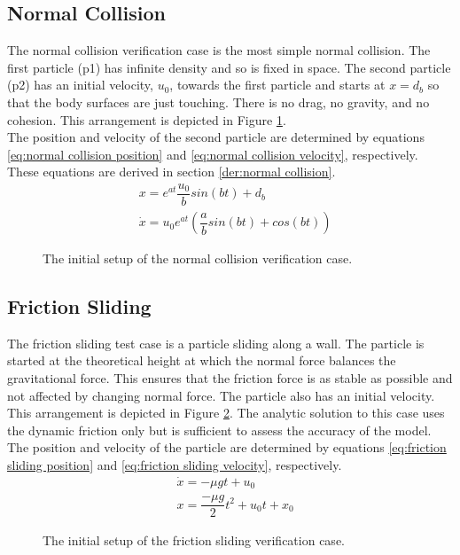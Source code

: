 \documentclass[10pt,a4paper,titlepage]{report}
\begin{document}
\subsection{Normal Collision}
\label{sec:normal collision verification}
The normal collision verification case is the most simple normal collision. The first particle (p1) has infinite density and so is fixed in space. The second particle (p2) has an initial velocity, $u_0$, towards the first particle and starts at $x = d_b$ so that the body surfaces are just touching. There is no drag, no gravity, and no cohesion. This arrangement is depicted in Figure \ref{fig:normal collision}.
\\The position and velocity of the second particle are determined by equations \ref{eq:normal collision position} and \ref{eq:normal collision velocity}, respectively. These equations are derived in section \ref{der:normal collision}.
\begin{align}
&x = e^{at} \dfrac{u_0}{b} sin(bt) + d_b \label{eq:normal collision position} \\
&\dot{x} = u_0 e^{at} (\dfrac{a}{b} sin(bt) + cos(bt)) \label{eq:normal collision velocity}
\end{align}
\begin{figure}[!ht]
\centering

\caption{The initial setup of the normal collision verification case.}
\label{fig:normal collision}
\end{figure}
\subsection{Friction Sliding}
\label{sec:friction sliding verification}
The friction sliding test case is a particle sliding along a wall. The particle is started at the theoretical height at which the normal force balances the gravitational force. This ensures that the friction force is as stable as possible and not affected by changing normal force. The particle also has an initial velocity. This arrangement is depicted in Figure \ref{fig:friction sliding}.
The analytic solution to this case uses the dynamic friction only but is sufficient to assess the accuracy of the model. The position and velocity of the particle are determined by equations \ref{eq:friction sliding position} and \ref{eq:friction sliding velocity}, respectively.
\begin{align}
&\dot{x} = - \mu g t + u_0 \label{eq:friction sliding velocity} \\
&x = \dfrac{- \mu g}{2}t^2 + u_0 t + x_0 \label{eq:friction sliding position}
\end{align}
\begin{figure}[!ht]
\centering

\caption{The initial setup of the friction sliding verification case.}
\label{fig:friction sliding}
\end{figure}
\end{document}
